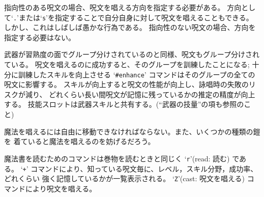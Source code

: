指向性のある呪文の場合、呪文を唱える方向を指定する必要がある。
方向として`{\tt .}'または`{\tt s}'を指定することで自分自身に対して呪文を唱えることもできる。
しかし、これはしばしば愚かな行為である。
指向性のない呪文の場合、方向を指定する必要はない。

武器が習熟度の面でグループ分けされているのと同様、呪文もグループ分けされている。
呪文を唱えるのに成功すると、そのグループを訓練したことになる;
十分に訓練したスキルを向上させる `{\tt \#enhance}' コマンドはそのグループの全ての
呪文に影響する。
スキルが向上すると呪文の性能が向上し、詠唱時の失敗のリスクが減り、
どれくらい長い間呪文が記憶に残っているかの推定の精度が向上する。
技能スロットは武器スキルと共有する。(``武器の技量''の項も参照のこと)

魔法を唱えるには自由に移動できなければならない。また、いくつかの種類の鎧を
着ていると魔法を唱えるのを妨げるだろう。

魔法書を読むためのコマンドは巻物を読むときと同じく `{\tt r}'(read: 読む) である。
`{\tt +}' コマンドにより、知っている呪文毎に、レベル，スキル分野，成功率、どれくらい
強く記憶しているかが一覧表示される。
`{\tt Z}'(cast: 呪文を唱える) コマンドにより呪文を唱える。

